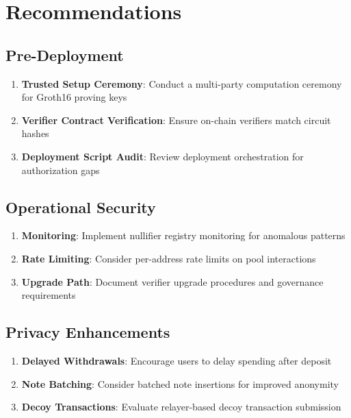 \documentclass[11pt,a4paper]{article}
\begin{document}
\section{Recommendations}

\subsection{Pre-Deployment}

\begin{enumerate}
    \item \textbf{Trusted Setup Ceremony}: Conduct a multi-party computation ceremony for Groth16 proving keys
    \item \textbf{Verifier Contract Verification}: Ensure on-chain verifiers match circuit hashes
    \item \textbf{Deployment Script Audit}: Review deployment orchestration for authorization gaps
\end{enumerate}

\subsection{Operational Security}

\begin{enumerate}
    \item \textbf{Monitoring}: Implement nullifier registry monitoring for anomalous patterns
    \item \textbf{Rate Limiting}: Consider per-address rate limits on pool interactions
    \item \textbf{Upgrade Path}: Document verifier upgrade procedures and governance requirements
\end{enumerate}

\subsection{Privacy Enhancements}

\begin{enumerate}
    \item \textbf{Delayed Withdrawals}: Encourage users to delay spending after deposit
    \item \textbf{Note Batching}: Consider batched note insertions for improved anonymity
    \item \textbf{Decoy Transactions}: Evaluate relayer-based decoy transaction submission
\end{enumerate}
\end{document}
